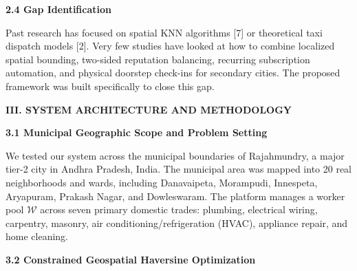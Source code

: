 \documentclass[10pt,twocolumn,a4paper]{article}
\begin{document}
\vspace{0.35em}
\noindent
\textbf{2.4 Gap Identification}

Past research has focused on spatial KNN algorithms [7] or theoretical taxi dispatch models [2]. Very few studies have looked at how to combine localized spatial bounding, two-sided reputation balancing, recurring subscription automation, and physical doorstep check-ins for secondary cities. The proposed framework was built specifically to close this gap.

\vspace{0.45em}
\noindent
\textbf{\large III. SYSTEM ARCHITECTURE AND METHODOLOGY}

\vspace{0.3em}
\noindent
\textbf{3.1 Municipal Geographic Scope and Problem Setting}

We tested our system across the municipal boundaries of Rajahmundry, a major tier-2 city in Andhra Pradesh, India. The municipal area was mapped into 20 real neighborhoods and wards, including Danavaipeta, Morampudi, Innespeta, Aryapuram, Prakash Nagar, and Dowleswaram. The platform manages a worker pool $\mathcal{W}$ across seven primary domestic trades: plumbing, electrical wiring, carpentry, masonry, air conditioning/refrigeration (HVAC), appliance repair, and home cleaning.

\vspace{0.35em}
\noindent
\textbf{3.2 Constrained Geospatial Haversine Optimization}
\end{document}
